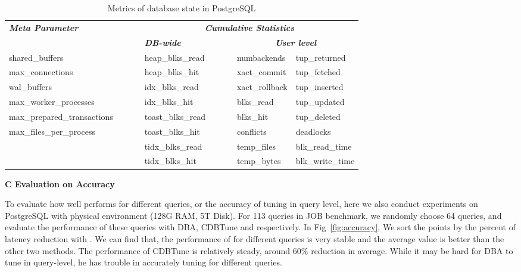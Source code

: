 \begin{table*}[ht]
\centering
\caption{Metrics of database state in PostgreSQL}
\label{tbl:state}
\vspace{0.5em}
{
\begin{tabular}{llllll}\hline
\multirow{2}{*}{\textbf{\textit{Meta Parameter}}} & & \multicolumn{4}{c}{\textbf{\textit{Cumulative Statistics}}}             \\

                                  & $\ \ \ \ \ \ \ \ $  & \textbf{\textit{DB-wide}} &  $\ \ \ \ \ \ \ \ $  & \multicolumn{2}{c}{\textbf{\textit{User level}}}  \\\hline
               shared\_buffers      &     & heap\_blks\_read  &  & numbackends    & tup\_returned    \\
               max\_connections     &        & heap\_blks\_hit  & & xact\_commit   & tup\_fetched     \\
               wal\_buffers      &      & idx\_blks\_read &  & xact\_rollback & tup\_inserted    \\
              max\_worker\_processes   &     & idx\_blks\_hit   & & blks\_read     & tup\_updated     \\
          max\_prepared\_transactions    &        & toast\_blks\_read & & blks\_hit      & tup\_deleted     \\
 max\_files\_per\_process    &          & toast\_blks\_hit &  & conflicts      & deadlocks        \\
                              &       & tidx\_blks\_read &  & temp\_files    & blk\_read\_time  \\
                               &      & tidx\_blks\_hit   & & temp\_bytes    & blk\_write\_time \\\hline
\end{tabular}
}
\end{table*}


\vspace{1.5em}
\noindent \textbf{\large C Evaluation on Accuracy}
\label{sec: accuracy}

To evaluate how well \oursys performs for different queries, or the accuracy of tuning in query level, here we also conduct experiments on PostgreSQL with physical environment (128G RAM, 5T Disk). For 113 queries in JOB benchmark, we randomly choose 64 queries, and evaluate the performance of these queries with DBA, CDBTune and \oursys respectively. In Fig~\ref{fig:accuracy}, We sort the points by the  percent of latency reduction with \oursys. We can find that, the performance of \oursys for different queries is very stable and the average value is better than the other two methods. The performance of CDBTune is relatively steady, around 60$\%$ reduction in average. While it may be hard for DBA to tune in query-level, he has trouble in accurately tuning for different queries.

